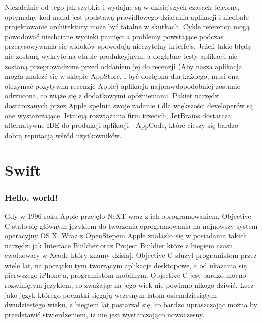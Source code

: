 Niezależnie od tego jak szybkie i wydajne są w dzisiejszych czasach telefony, optymalny kod nadal jest podstawą prawidłowego działania aplikacji i niedbałe projektowanie architektury może być fatalne w skutkach. Cykle referencji mogą powodować niechciane wycieki pamięci a problemy powstające podczas przerysowywania się widoków spowodują nieczytelny interfejs. Jeżeli takie błędy nie zostaną wykryte na etapie produkcyjnym, a dogłębne testy aplikacji nie zostaną przeprowadzone przed oddaniem jej do recenzji (Aby nasza aplikacja mogła znaleźć się w sklepie AppStore, i być dostępna dla każdego, musi ona otrzymać pozytywną recenzje Apple) aplikacja najprawdopodobniej zostanie odrzucona, co wiąże się z dodatkowymi opóźnieniami. Pakiet narzędzi dostarczanych przez Apple spełnia swoje zadanie i dla większości developerów są one wystarczające. Istnieją rozwiązania firm trzecich, JetBrains dostarcza alternatywne IDE do produkcji aplikacji - AppCode, które cieszy się bardzo dobrą reputacją wśród użytkowników.

\section{Swift}

\subsubsection*{Hello, world!}

Gdy w 1996 roku Apple przejęło NeXT wraz z ich oprogramowaniem, Objective-C stało się głównym językiem do tworzenia oprogramowania na najnowszy system operacyjny OS X. Wraz z OpenStepem Apple znalazło się w posiadaniu takich narzędzi jak Interface Buildier oraz Project Buildier które z biegiem czasu ewoluowały w Xcode który znamy dzisiaj. Objective-C służył programistom przez wiele lat, na początku tym tworzącym aplikacje desktopowe, a od ukazania się pierwszego iPhone'a, programistom mobilnym. Objective-C jest bardzo mocno rozwiniętym językiem, co zważając na jego wiek nie powinno nikogo dziwić. Lecz jako język którego początki sięgają wczesnym latom osiemdziesiątym dwudziestego wieku, z biegiem lat postarzał się, co bardzo upraszczając można by przedstawić stwierdzeniem, iż nie jest wystarczająco nowoczesny.

